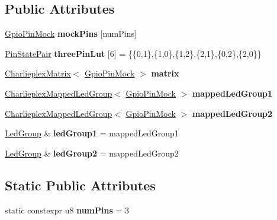 \subsection*{Public Attributes}
\begin{DoxyCompactItemize}
\item 
\mbox{\label{class_charlieplex_mapped_led_group_test_a0531246d5c1fccddc4457f44100d45e8}} 
\mbox{\hyperlink{class_gpio_pin_mock}{Gpio\+Pin\+Mock}} {\bfseries mock\+Pins} \mbox{[}num\+Pins\mbox{]}
\item 
\mbox{\label{class_charlieplex_mapped_led_group_test_afebc2ca864f0792662bfa54f6bf6beef}} 
\mbox{\hyperlink{struct_pin_state_pair}{Pin\+State\+Pair}} {\bfseries three\+Pin\+Lut} \mbox{[}6\mbox{]} = \{\{0,1\},\{1,0\},\{1,2\},\{2,1\},\{0,2\},\{2,0\}\}
\item 
\mbox{\hyperlink{class_charlieplex_matrix}{Charlieplex\+Matrix}}$<$ \mbox{\hyperlink{class_gpio_pin_mock}{Gpio\+Pin\+Mock}} $>$ {\bfseries matrix}
\item 
\mbox{\hyperlink{class_charlieplex_mapped_led_group}{Charlieplex\+Mapped\+Led\+Group}}$<$ \mbox{\hyperlink{class_gpio_pin_mock}{Gpio\+Pin\+Mock}} $>$ {\bfseries mapped\+Led\+Group1}
\item 
\mbox{\hyperlink{class_charlieplex_mapped_led_group}{Charlieplex\+Mapped\+Led\+Group}}$<$ \mbox{\hyperlink{class_gpio_pin_mock}{Gpio\+Pin\+Mock}} $>$ {\bfseries mapped\+Led\+Group2}
\item 
\mbox{\label{class_charlieplex_mapped_led_group_test_ae47eae15d58a483cd49180fe2f609fff}} 
\mbox{\hyperlink{class_led_group}{Led\+Group}} \& {\bfseries led\+Group1} = mapped\+Led\+Group1
\item 
\mbox{\label{class_charlieplex_mapped_led_group_test_aa6346416348ffefeab418e136f65435a}} 
\mbox{\hyperlink{class_led_group}{Led\+Group}} \& {\bfseries led\+Group2} = mapped\+Led\+Group2
\end{DoxyCompactItemize}
\subsection*{Static Public Attributes}
\begin{DoxyCompactItemize}
\item 
\mbox{\label{class_charlieplex_mapped_led_group_test_a3b4b10b62585243c8b58b98ad01b9158}} 
static constexpr u8 {\bfseries num\+Pins} = 3
\end{DoxyCompactItemize}


